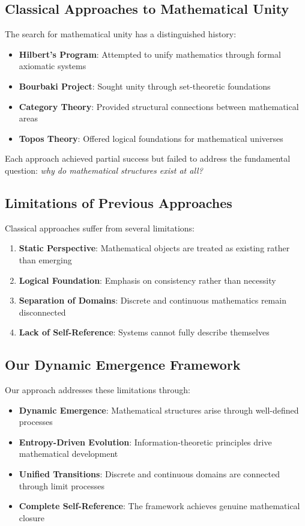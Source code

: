 \documentclass[12pt]{article}
\theoremstyle{plain}
\theoremstyle{definition}
\begin{document}
\subsection{Classical Approaches to Mathematical Unity}

The search for mathematical unity has a distinguished history:
\begin{itemize}
\item \textbf{Hilbert's Program}: Attempted to unify mathematics through formal axiomatic systems
\item \textbf{Bourbaki Project}: Sought unity through set-theoretic foundations
\item \textbf{Category Theory}: Provided structural connections between mathematical areas
\item \textbf{Topos Theory}: Offered logical foundations for mathematical universes
\end{itemize}

Each approach achieved partial success but failed to address the fundamental question: \emph{why do mathematical structures exist at all?}

\subsection{Limitations of Previous Approaches}

Classical approaches suffer from several limitations:
\begin{enumerate}
\item \textbf{Static Perspective}: Mathematical objects are treated as existing rather than emerging
\item \textbf{Logical Foundation}: Emphasis on consistency rather than necessity
\item \textbf{Separation of Domains}: Discrete and continuous mathematics remain disconnected
\item \textbf{Lack of Self-Reference}: Systems cannot fully describe themselves
\end{enumerate}

\subsection{Our Dynamic Emergence Framework}

Our approach addresses these limitations through:
\begin{itemize}
\item \textbf{Dynamic Emergence}: Mathematical structures arise through well-defined processes
\item \textbf{Entropy-Driven Evolution}: Information-theoretic principles drive mathematical development
\item \textbf{Unified Transitions}: Discrete and continuous domains are connected through limit processes
\item \textbf{Complete Self-Reference}: The framework achieves genuine mathematical closure
\end{itemize}
\end{document}
